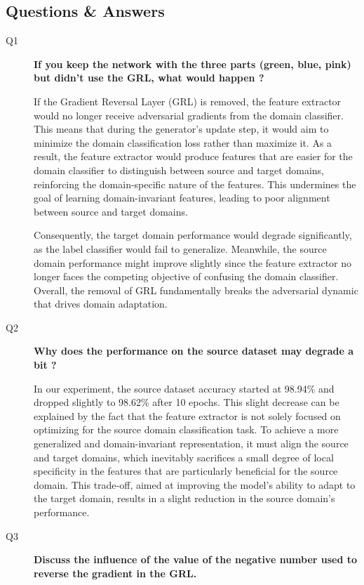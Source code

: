 \documentclass{rapportECL}
\begin{document}
\subsection{Questions \& Answers}
\begin{description}
    \item[Q1 ] \textbf{If you keep the network with the three parts (green, blue, pink) but didn’t use the GRL, what would happen ?}
    
    If the Gradient Reversal Layer (GRL) is removed, the feature extractor would no longer receive adversarial gradients from the domain classifier. This means that during the generator’s update step, it would aim to minimize the domain classification loss rather than maximize it. As a result, the feature extractor would produce features that are easier for the domain classifier to distinguish between source and target domains, reinforcing the domain-specific nature of the features. This undermines the goal of learning domain-invariant features, leading to poor alignment between source and target domains. 
    
    Consequently, the target domain performance would degrade significantly, as the label classifier would fail to generalize. Meanwhile, the source domain performance might improve slightly since the feature extractor no longer faces the competing objective of confusing the domain classifier. Overall, the removal of GRL fundamentally breaks the adversarial dynamic that drives domain adaptation.

    \item[Q2 ] \textbf{Why does the performance on the source dataset may degrade a bit ?}

    In our experiment, the source dataset accuracy started at 98.94\% and dropped slightly to 98.62\% after 10 epochs. This slight decrease can be explained by the fact that the feature extractor is not solely focused on optimizing for the source domain classification task. To achieve a more generalized and domain-invariant representation, it must align the source and target domains, which inevitably sacrifices a small degree of local specificity in the features that are particularly beneficial for the source domain. This trade-off, aimed at improving the model's ability to adapt to the target domain, results in a slight reduction in the source domain's performance.

    \item[Q3 ] \textbf{Discuss the influence of the value of the negative number used to reverse the gradient in the GRL.}


\end{description}
\end{document}
